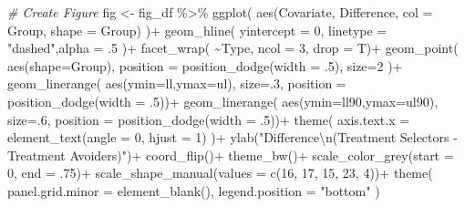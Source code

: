 \documentclass[
]{article}
\newenvironment{Shaded}{\begin{snugshade}}{\end{snugshade}}
\newcommand{\AttributeTok}[1]{\textcolor[rgb]{0.77,0.63,0.00}{#1}}
\newcommand{\CommentTok}[1]{\textcolor[rgb]{0.56,0.35,0.01}{\textit{#1}}}
\newcommand{\DecValTok}[1]{\textcolor[rgb]{0.00,0.00,0.81}{#1}}
\newcommand{\FunctionTok}[1]{\textcolor[rgb]{0.00,0.00,0.00}{#1}}
\newcommand{\NormalTok}[1]{#1}
\newcommand{\OtherTok}[1]{\textcolor[rgb]{0.56,0.35,0.01}{#1}}
\newcommand{\SpecialCharTok}[1]{\textcolor[rgb]{0.00,0.00,0.00}{#1}}
\newcommand{\StringTok}[1]{\textcolor[rgb]{0.31,0.60,0.02}{#1}}
\begin{document}
\begin{Shaded}
\begin{Highlighting}[]
  \CommentTok{\# Create Figure }
\NormalTok{  fig }\OtherTok{\textless{}{-}}\NormalTok{ fig\_df }\SpecialCharTok{\%\textgreater{}\%} 
    \FunctionTok{ggplot}\NormalTok{(}
      \FunctionTok{aes}\NormalTok{(Covariate, Difference, }\AttributeTok{col =}\NormalTok{ Group, }\AttributeTok{shape =}\NormalTok{ Group)}
\NormalTok{    )}\SpecialCharTok{+}
    \FunctionTok{geom\_hline}\NormalTok{(}
      \AttributeTok{yintercept =} \DecValTok{0}\NormalTok{, }\AttributeTok{linetype =} \StringTok{"dashed"}\NormalTok{,}\AttributeTok{alpha =}\NormalTok{ .}\DecValTok{5}
\NormalTok{    )}\SpecialCharTok{+}
    \FunctionTok{facet\_wrap}\NormalTok{(}
      \SpecialCharTok{\textasciitilde{}}\NormalTok{Type, }\AttributeTok{ncol =} \DecValTok{3}\NormalTok{, }\AttributeTok{drop =}\NormalTok{ T)}\SpecialCharTok{+}
    \FunctionTok{geom\_point}\NormalTok{(}
      \FunctionTok{aes}\NormalTok{(}\AttributeTok{shape=}\NormalTok{Group),}
      \AttributeTok{position =} \FunctionTok{position\_dodge}\NormalTok{(}\AttributeTok{width =}\NormalTok{ .}\DecValTok{5}\NormalTok{), }\AttributeTok{size=}\DecValTok{2}
\NormalTok{    )}\SpecialCharTok{+}
    \FunctionTok{geom\_linerange}\NormalTok{(}
      \FunctionTok{aes}\NormalTok{(}\AttributeTok{ymin=}\NormalTok{ll,}\AttributeTok{ymax=}\NormalTok{ul),}
      \AttributeTok{size=}\NormalTok{.}\DecValTok{3}\NormalTok{,}
      \AttributeTok{position =} \FunctionTok{position\_dodge}\NormalTok{(}\AttributeTok{width =}\NormalTok{ .}\DecValTok{5}\NormalTok{))}\SpecialCharTok{+}
    \FunctionTok{geom\_linerange}\NormalTok{(}
      \FunctionTok{aes}\NormalTok{(}\AttributeTok{ymin=}\NormalTok{ll90,}\AttributeTok{ymax=}\NormalTok{ul90),}
      \AttributeTok{size=}\NormalTok{.}\DecValTok{6}\NormalTok{,}
      \AttributeTok{position =} \FunctionTok{position\_dodge}\NormalTok{(}\AttributeTok{width =}\NormalTok{ .}\DecValTok{5}\NormalTok{))}\SpecialCharTok{+}
    \FunctionTok{theme}\NormalTok{(}
      \AttributeTok{axis.text.x =} \FunctionTok{element\_text}\NormalTok{(}\AttributeTok{angle =} \DecValTok{0}\NormalTok{, }\AttributeTok{hjust =} \DecValTok{1}\NormalTok{)}
\NormalTok{    )}\SpecialCharTok{+}
    \FunctionTok{ylab}\NormalTok{(}\StringTok{"Difference}\SpecialCharTok{\textbackslash{}n}\StringTok{(Treatment Selectors {-} Treatment Avoiders)"}\NormalTok{)}\SpecialCharTok{+}
    \FunctionTok{coord\_flip}\NormalTok{()}\SpecialCharTok{+}
    \FunctionTok{theme\_bw}\NormalTok{()}\SpecialCharTok{+}
    \FunctionTok{scale\_color\_grey}\NormalTok{(}\AttributeTok{start =} \DecValTok{0}\NormalTok{, }\AttributeTok{end =}\NormalTok{ .}\DecValTok{75}\NormalTok{)}\SpecialCharTok{+}
    \FunctionTok{scale\_shape\_manual}\NormalTok{(}\AttributeTok{values =} \FunctionTok{c}\NormalTok{(}\DecValTok{16}\NormalTok{, }\DecValTok{17}\NormalTok{, }\DecValTok{15}\NormalTok{, }\DecValTok{23}\NormalTok{, }\DecValTok{4}\NormalTok{))}\SpecialCharTok{+}
    \FunctionTok{theme}\NormalTok{(}
      \AttributeTok{panel.grid.minor =} \FunctionTok{element\_blank}\NormalTok{(),}
      \AttributeTok{legend.position =} \StringTok{"bottom"}
\NormalTok{    )}
  

\end{Highlighting}
\end{Shaded}
\end{document}
